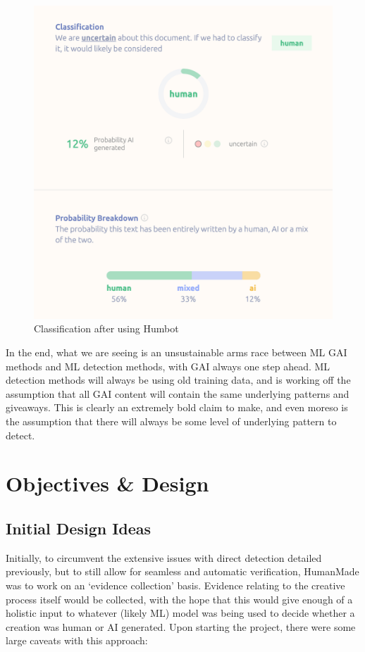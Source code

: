 \documentclass[12pt,a4paper]{article}
\begin{document}
\begin{figure}[H]
\begin{minipage}{0.45\textwidth}
        \includegraphics[width=\textwidth]{humbot1.png}
        \caption{Classification after using Humbot}
        \label{fig:humbotFig}
    \end{minipage}
\end{figure}

In the end, what we are seeing is an unsustainable arms race between ML GAI methods and ML detection methods, with GAI always one step ahead. ML detection methods will always be using old training data, and is working off the assumption that all GAI content will contain the same underlying patterns and giveaways. This is clearly an extremely bold claim to make, and even moreso is the assumption that there will always be some level of underlying pattern to detect.

\section{Objectives \& Design}
\subsection{Initial Design Ideas}
Initially, to circumvent the extensive issues with direct detection detailed previously, but to still allow for seamless and automatic verification, HumanMade was to work on an `evidence collection' basis. Evidence relating to the creative process itself would be collected, with the hope that this would give enough of a holistic input to whatever (likely ML) model was being used to decide whether a creation was human or AI generated. Upon starting the project, there were some large caveats with this approach:
\end{document}
